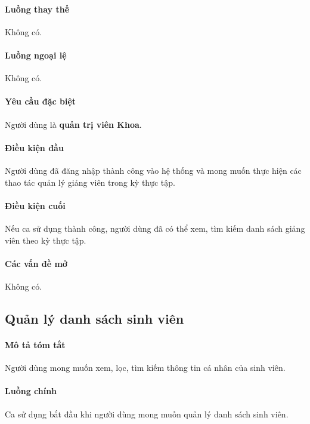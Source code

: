\documentclass[./../main.tex]{subfiles}
\begin{document}
\paragraph*{Luồng thay thế} Không có.

\paragraph*{Luồng ngoại lệ} Không có.

\paragraph*{Yêu cầu đặc biệt}

Người dùng là \textbf{quản trị viên Khoa}.

\paragraph*{Điều kiện đầu}

Người dùng đã đăng nhập thành công vào hệ thống và mong muốn thực hiện các thao tác quản lý giảng viên trong kỳ thực tập.

\paragraph*{Điều kiện cuối}

Nếu ca sử dụng thành công, người dùng đã có thể xem, tìm kiếm danh sách giảng viên theo kỳ thực tập.

\paragraph*{Các vấn đề mở}

Không có.

\subsection{Quản lý danh sách sinh viên}

\paragraph*{Mô tả tóm tắt}

Người dùng mong muốn xem, lọc, tìm kiếm thông tin cá nhân của sinh viên.

\paragraph*{Luồng chính} Ca sử dụng bắt đầu khi người dùng mong muốn quản lý danh sách sinh viên.
\end{document}
